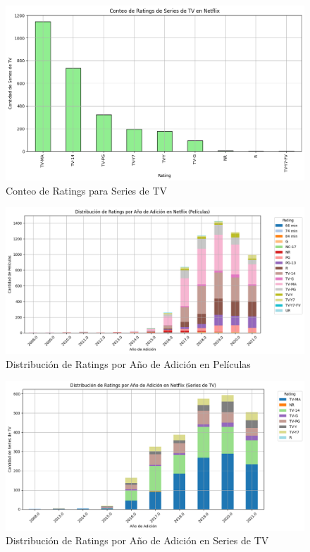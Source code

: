 \documentclass{article}
\begin{document}
\begin{figure}[H]
    \centering
    \includegraphics[width=\textwidth]{Graphs/conteo_rating_series.png}
    \caption{Conteo de Ratings para Series de TV}
    \label{fig:conteo_ratings_series}
\end{figure}

\begin{figure}[H]
    \centering
    \includegraphics[width=\textwidth]{Graphs/dist_rating_year_peliculas.png}
    \caption{Distribución de Ratings por Año de Adición en Películas}
    \label{fig:distribucion_ratings_peliculas}
\end{figure}

\begin{figure}[H]
    \centering
    \includegraphics[width=\textwidth]{Graphs/dist_rating_year_series.png}
    \caption{Distribución de Ratings por Año de Adición en Series de TV}
    \label{fig:distribucion_ratings_series}
\end{figure}
\end{document}
